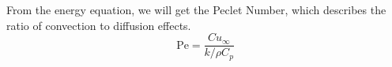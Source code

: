From the energy equation, we will get the Peclet Number, which describes the ratio of convection to diffusion effects.
\begin{equation*}
    \text{Pe} = \frac{C u_{\infty}}{k/\rho C_p}
\end{equation*}


